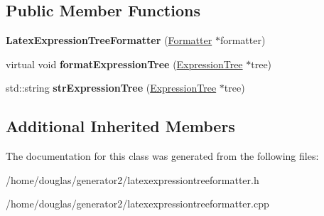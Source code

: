 \subsection*{Public Member Functions}
\begin{DoxyCompactItemize}
\item 
{\bfseries Latex\+Expression\+Tree\+Formatter} (\hyperlink{classFormatter}{Formatter} $\ast$formatter)\hypertarget{classLatexExpressionTreeFormatter_a549a011e2c44606febeefe6f180ba49d}{}\label{classLatexExpressionTreeFormatter_a549a011e2c44606febeefe6f180ba49d}

\item 
virtual void {\bfseries format\+Expression\+Tree} (\hyperlink{classExpressionTree}{Expression\+Tree} $\ast$tree)\hypertarget{classLatexExpressionTreeFormatter_a124d90415c9f34aaf6f9960c199481ec}{}\label{classLatexExpressionTreeFormatter_a124d90415c9f34aaf6f9960c199481ec}

\item 
std\+::string {\bfseries str\+Expression\+Tree} (\hyperlink{classExpressionTree}{Expression\+Tree} $\ast$tree)\hypertarget{classLatexExpressionTreeFormatter_a1f51232d495926c065c0ace87dadad5b}{}\label{classLatexExpressionTreeFormatter_a1f51232d495926c065c0ace87dadad5b}

\end{DoxyCompactItemize}
\subsection*{Additional Inherited Members}


The documentation for this class was generated from the following files\+:\begin{DoxyCompactItemize}
\item 
/home/douglas/generator2/latexexpressiontreeformatter.\+h\item 
/home/douglas/generator2/latexexpressiontreeformatter.\+cpp\end{DoxyCompactItemize}
